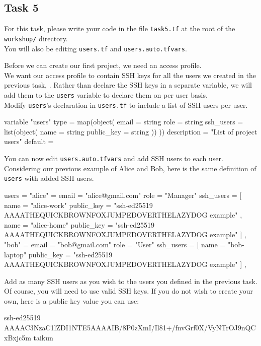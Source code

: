 \subsection{Task 5}\label{sec:task5}

\begin{note}
For this task, please write your code in the file \texttt{task5.tf}
at the root of the \texttt{workshop/} directory.\\
You will also be editing \texttt{users.tf} and \texttt{users.auto.tfvars}.
\end{note}

Before we can create our first project, we need an access profile.\\

We want our access profile to contain SSH keys for all the users we created in the previous task, .
Rather than declare the SSH keys in a separate variable, we will add them to the \texttt{users} variable to
declare them on per user basis.\\

Modify \texttt{users}'s declaration in \texttt{users.tf} to include a list of SSH users per user.
\begin{tf}
variable "users" {
  type = map(object({
    email = string
    role  = string
    ssh_users = list(object({
      name       = string
      public_key = string
    }))
  }))
  description = "List of project users"
  default     = {}
}
\end{tf}

You can now edit \texttt{users.auto.tfvars} and add SSH users to each user.
Considering our previous example of Alice and Bob, here is the same definition of \texttt{users}
with added SSH users.
\begin{tf}
users = {
  "alice" = {
    email = "alice@gmail.com"
    role  = "Manager"
    ssh_users = [
      {
        name       = "alice-work"
        public_key = "ssh-ed25519 AAAATHEQUICKBROWNFOXJUMPEDOVERTHELAZYDOG example"
      },
      {
        name       = "alice-home"
        public_key = "ssh-ed25519 AAAATHEQUICKBROWNFOXJUMPEDOVERTHELAZYDOG example"
      }
    ]
  },
  "bob" = {
    email = "bob@gmail.com"
    role  = "User"
    ssh_users = [
      {
        name         = "bob-laptop"
        public_key = "ssh-ed25519 AAAATHEQUICKBROWNFOXJUMPEDOVERTHELAZYDOG example"
      }
    ]
  },
}
\end{tf}
Add as many SSH users as you wish to the users you defined in the previous task.
Of course, you will need to use valid SSH keys. If you do not wish to create your own,
here is a public key value you can use:
\begin{raw}
ssh-ed25519 AAAAC3NzaC1lZDI1NTE5AAAAIB/8P0zXmI/Il81+/fnvGrf0X/VyNTrOJ9nQCxBxjc5m taikun
\end{raw}

